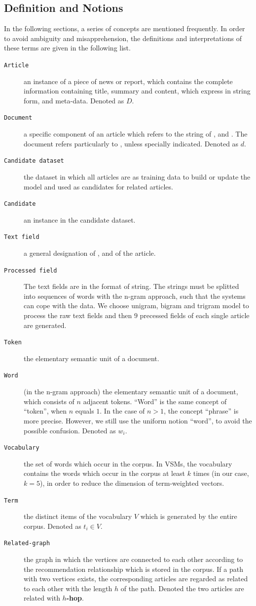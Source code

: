 \bigbreak

\subsection{Definition and Notions}
\label{sec:4.2}

In the following sections, a series of concepts are mentioned frequently. In order to avoid ambiguity and misapprehension, the definitions and interpretations of these terms are given in the following list.

\begin{description}
\item[\texttt{Article}] an instance of a piece of news or report, which contains the complete information containing title, summary and content, which express in string form, and meta-data. Denoted as $D$.
\item[\texttt{Document}] a specific component of an article which refers to the string of \ititle{}, \isummary{} and \icontent{}. The document refers particularly to \icontent{}, unless specially indicated. Denoted as $d$.
\item[\texttt{Candidate dataset}] the dataset in which all articles are as training data to build or update the model and used as candidates for related articles. 
\item[\texttt{Candidate}] an instance in the candidate dataset.
\item[\texttt{Text field}] a general designation of \ititle{}, \isummary{} and \icontent{} of the article. 
\item[\texttt{Processed field}] The text fields are in the format of string. The strings must be splitted into sequences of words with the n-gram approach, such that the systems can cope with the data. We choose unigram, bigram and trigram model to process the raw text fields and then $9$ precessed fields of each single article are generated. 
\item[\texttt{Token}] the elementary semantic unit of a document.
\item[\texttt{Word}] (in the n-gram approach) the elementary semantic unit of a document, which consists of $n$ adjacent tokens. ``Word'' is the same concept of ``token'', when $n$ equals $1$. In the case of $n > 1$, the concept ``phrase'' is more precise. However, we still use the uniform notion ``word'', to avoid the possible confusion. Denoted as $w_i$. 
\item[\texttt{Vocabulary}] the set of words which occur in the corpus. In VSMs, the vocabulary contains the words which occur in the corpus at least $k$ times (in our case, $k=5$), in order to reduce the dimension of term-weighted vectors. 
\item[\texttt{Term}] the distinct items of the vocabulary $V$ which is generated by the entire corpus. Denoted as $t_i \in V$. 
\item[\texttt{Related-graph}] the graph in which the vertices are connected to each other according to the recommendation relationship which is stored in the corpus. If a path with two vertices exists, the corresponding articles are regarded as related to each other with the length $h$ of the path. Denoted the two articles are related with \textbf{$h$-hop}.


\end{description}
